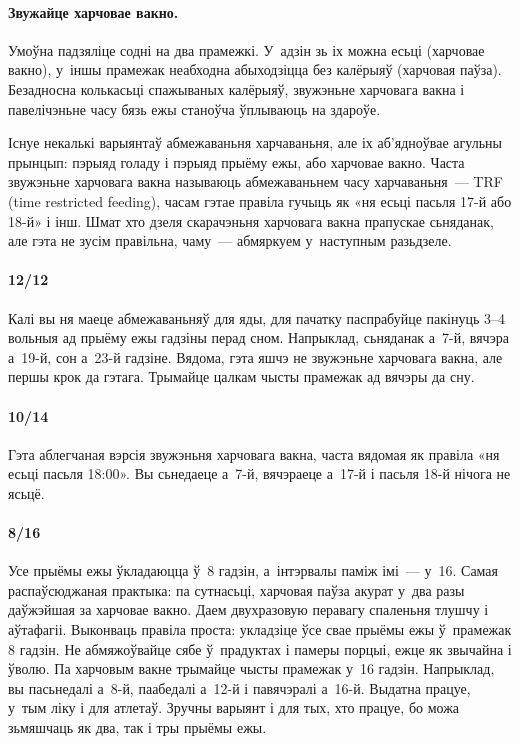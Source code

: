 \paragraph{Звужайце харчовае вакно.}
Умоўна падзяліце содні на два прамежкі. У~адзін зь іх можна есьці (харчовае вакно), у~іншы прамежак неабходна абыходзіцца без калёрыяў (харчовая паўза). Безадносна колькасьці спажываных калёрыяў, звужэньне харчовага вакна і павелічэньне часу бязь ежы станоўча ўплываюць на здароўе.


Існуе некалькі варыянтаў абмежаваньня харчаваньня, але іх аб'ядноўвае агульны прынцып: пэрыяд голаду і пэрыяд прыёму ежы, або харчовае вакно. Часта звужэньне харчовага вакна называюць абмежаваньнем часу харчаваньня~--- TRF (time restricted feeding), часам гэтае правіла гучыць як «ня есьці пасьля 17-й або 18-й» і інш. Шмат хто дзеля скарачэньня харчовага вакна прапускае сьняданак, але гэта не зусім правільна, чаму~--- абмяркуем у~наступным разьдзеле.

\paragraph{12/12}
Калі вы ня маеце абмежаваньняў для яды, для пачатку паспрабуйце пакінуць 3--4 вольныя ад прыёму ежы гадзіны перад сном. Напрыклад, сьняданак а~7-й, вячэра а~19-й, сон а~23-й гадзіне. Вядома, гэта яшчэ не звужэньне харчовага вакна, але першы крок да гэтага. Трымайце цалкам чысты прамежак ад вячэры да сну.

\paragraph{10/14}
Гэта аблегчаная вэрсія звужэньня харчовага вакна, часта вядомая як правіла «ня есьці пасьля 18:00». Вы сьнедаеце а~7-й, вячэраеце а~17-й і пасьля 18-й нічога не ясьцё.

\paragraph{8/16}
Усе прыёмы ежы ўкладаюцца ў~8 гадзін, а~інтэрвалы паміж імі~--- у~16. Самая распаўсюджаная практыка: па сутнасьці, харчовая паўза акурат у~два разы даўжэйшая за харчовае вакно. Даем двухразовую перавагу спаленьня тлушчу і аўтафагіі. Выконваць правіла проста: укладзіце ўсе свае прыёмы ежы ў~прамежак 8 гадзін. Не абмяжоўвайце сябе ў~прадуктах і памеры порцыі, ежце як звычайна і ўволю. Па харчовым вакне трымайце чысты прамежак у~16 гадзін. Напрыклад, вы пасьнедалі а~8-й, паабедалі а~12-й і павячэралі а~16-й. Выдатна працуе, у~тым ліку і для атлетаў. Зручны варыянт і для тых, хто працуе, бо можа зьмяшчаць як два, так і тры прыёмы ежы.


